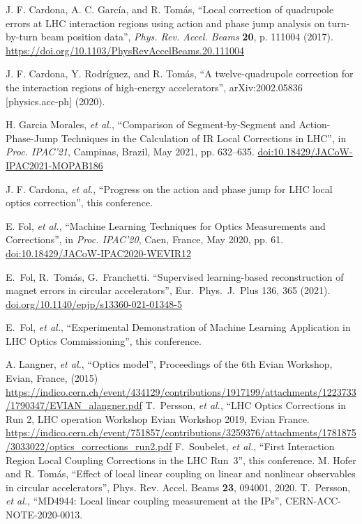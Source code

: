 \documentclass[a4paper]{cernatsnote}
\begin{document}
\begin{thebibliography}{99}
 J. F.  Cardona, A. C. Garc\'ia, and R. Tom\'as, ``Local correction of quadrupole errors at LHC interaction regions using action and phase jump analysis on turn-by-turn beam position data'', {\it Phys. Rev. Accel. Beams} {\bf 20}, p. 111004 (2017).
\url{https://doi.org/10.1103/PhysRevAccelBeams.20.111004}

 J. F.  Cardona, Y. Rodr\'iguez, and R. Tom\'as, ``A twelve-quadrupole correction for the interaction regions of high-energy accelerators'',  arXiv:2002.05836 [physics.acc-ph] (2020).

   H. Garcia Morales, {\it et al.},
   \textquotedblleft{Comparison of Segment-by-Segment and Action-Phase-Jump Techniques in the Calculation of IR Local Corrections in LHC}\textquotedblright,
   in \emph{Proc. IPAC’21}, Campinas, Brazil, May 2021, pp. 632--635.
   \url{doi:10.18429/JACoW-IPAC2021-MOPAB186}  

 J. F. Cardona, {\it et al.}, ``Progress on the action and phase jump for LHC local optics correction'', this conference.


  E. Fol, {\it et al.},
   \textquotedblleft{Machine Learning Techniques for Optics Measurements and Corrections}\textquotedblright,
   in \emph{Proc. IPAC’20}, Caen, France, May 2020, pp. 61.
   \url{doi:10.18429/JACoW-IPAC2020-WEVIR12} 

 E.~Fol, R.~Tom\'as,  G.~Franchetti. ``Supervised learning-based reconstruction of magnet errors in circular accelerators'', Eur.~Phys.~J.~Plus 136, 365 (2021). \url{doi.org/10.1140/epjp/s13360-021-01348-5}

 E.~Fol, {\it et al.}, ``Experimental Demonstration of Machine Learning Application in LHC Optics Commissioning'', this conference.


 A. Langner, {\it et al.}, “Optics model”, Proceedings of the 6th Evian Workshop,
Evian, France, (2015) \url{https://indico.cern.ch/event/434129/contributions/1917199/attachments/1223733/1790347/EVIAN_alangner.pdf}
%
T.~Persson, {\it et al.}, ``LHC Optics Corrections in Run 2, LHC operation Workshop Evian Workshop 2019, Evian France.
\url{https://indico.cern.ch/event/751857/contributions/3259376/attachments/1781875/3033022/optics_corrections_run2.pdf}
%
 F.~Soubelet, {\it et al.}, ``First Interaction Region Local Coupling Corrections in the LHC Run~3'', this conference.
%
 M. Hofer and R. Tom\'as, ``Effect of local linear coupling on linear and nonlinear observables in circular accelerators'',
Phys. Rev. Accel. Beams {\bf23}, 094001, 2020.
%
 T.~Persson, {\it et al.}, ``MD4944: Local linear coupling measurement at the IPs'', CERN-ACC-NOTE-2020-0013.


\end{thebibliography}
\end{document}
